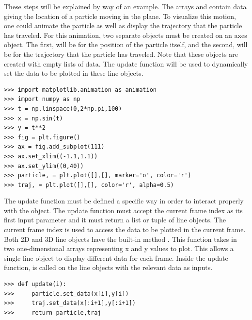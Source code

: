 These steps will be explained by way of an example.
The arrays  and  contain data giving the location of a particle moving in the plane.
To visualize this motion, one could animate the particle as well as display the trajectory that the particle has traveled.
For this animation, two separate  objects must be created on an axes object.
The first,  will be for the position of the particle itself, and the second,  will be for the trajectory that the particle has traveled.
Note that these objects are created with empty lists of data.
The update function will be used to dynamically set the data to be plotted in these line objects.

\begin{lstlisting}
>>> import matplotlib.animation as animation
>>> import numpy as np
>>> t = np.linspace(0,2*np.pi,100)
>>> x = np.sin(t)
>>> y = t**2
>>> fig = plt.figure()
>>> ax = fig.add_subplot(111)
>>> ax.set_xlim((-1.1,1.1))
>>> ax.set_ylim((0,40))
>>> particle, = plt.plot([],[], marker='o', color='r')
>>> traj, = plt.plot([],[], color='r', alpha=0.5)
\end{lstlisting}

The update function must be defined a specific way in order to interact properly with the 
 object.
The update function must accept the current frame index as its first input parameter and it must return a list or tuple of line objects.
The current frame index is used to access the data to be plotted in the current frame. 
Both 2D and 3D line objects have the built-in method .
This function takes in two one-dimensional arrays representing x and y values to plot.
This allows a single line object to display different data for each frame.
Inside the update function,  is called on the line objects with the relevant data as inputs.


\begin{lstlisting}
>>> def update(i):
>>>     particle.set_data(x[i],y[i])
>>>     traj.set_data(x[:i+1],y[:i+1])
>>>     return particle,traj
\end{lstlisting}

